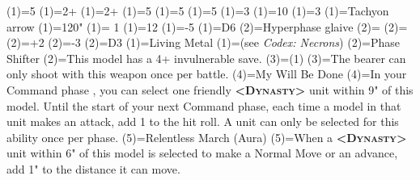 \renewcommand{\UnitName}{Overlord }%
\renewcommand{\UnitPower}{5}%
\renewcommand{\UnitIcon}{HQ.svg}%
%
\renewcommand{\StatBlocks}{1}%
\Movement(1)={5}%
\WeaponSkill(1)={2+}%
\BalisticSkill(1)={2+}%
\Strength(1)={5}%
\Toughness(1)={5}%
\Wounds(1)={5}%
\Attacks(1)={3}%
\Leadership(1)={10}%
\Save(1)={3}%
%
\renewcommand{\UnitText}{1 \UnitName equiped with: \WeaponName(1); \WeaponName(2).}%
%
%
\renewcommand{\NumWeapon}{2}%
\WeaponName(1)={Tachyon arrow}%
\WeaponRange(1)={120"}%
\WeaponType(1)={ 1}%
\WeaponStrength(1)={12}%
\WeaponAP(1)={-5}%
\WeaponDamage(1)={D6}%
%
\WeaponName(2)={Hyperphase glaive}%
\WeaponRange(2)={}%
\WeaponType(2)={}%
\WeaponStrength(2)={+2}%
\WeaponAP(2)={-3}%
\WeaponDamage(2)={D3}%
%
\renewcommand{\NumAbilities}{3}%
\AbilityName(1)={Living Metal}%
\AbilityDescription(1)={(see \textit{Codex: Necrons})}%
%
\AbilityName(2)={Phase Shifter}%
\AbilityDescription(2)={This model has a 4+ invulnerable save.}%
%
\AbilityName(3)={\WeaponName(1)}%
\AbilityDescription(3)={The bearer can only shoot with this weapon once per battle.}%
%
\AbilityName(4)={My Will Be Done}%
\AbilityDescription(4)={In your Command phase , you can select one friendly \textsc{\textbf{<Dynasty>}} unit within 9" of this model. Until the start of your next Command phase, each time a model in that unit makes an attack, add 1 to the hit roll. A unit can only be selected for this ability once per phase.}%
%
\AbilityName(5)={Relentless March (Aura)}%
\AbilityDescription(5)={When a \textsc{\textbf{<Dynasty>}} unit within 6" of this model is selected to make a Normal Move or an advance, add 1" to the distance it can move.}%
%
\renewcommand{\FactionKeywords}{Necrons, <Dynasty>}%
\renewcommand{\Keywords}{Infantry, Character, Noble, \UnitName}%
\newcommand{\ExtraFrontTitle}{\AbilityName(5)}%
\renewcommand{\ExtraFrontText}{\AbilityDescription(5)}%
\newcommand{\ExtraBackTitle}{\AbilityName(4)}%
\renewcommand{\ExtraBackText}{\AbilityDescription(4)}%
\endinput%